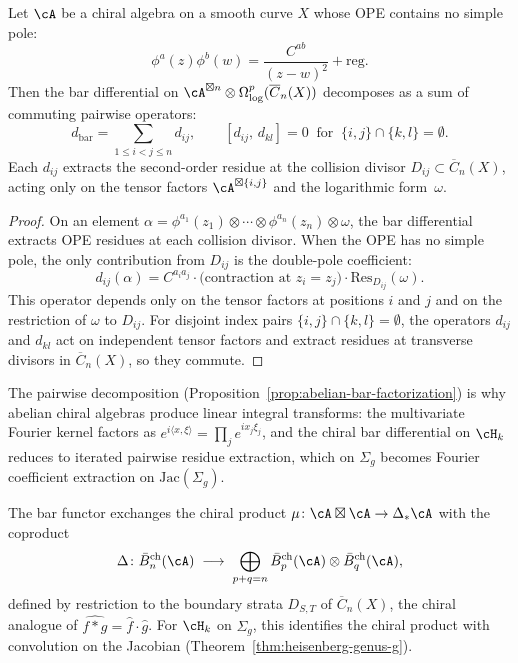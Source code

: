 \begin{proposition}
\label{prop:abelian-bar-factorization}
Let\/ $\cA$ be a chiral algebra on a smooth curve $X$ whose OPE
contains no simple pole:
\[
\phi^a(z)\phi^b(w)
= \frac{C^{ab}}{(z-w)^2} + \mathrm{reg}.
\]
Then the bar differential on
$\cA^{\boxtimes n} \otimes \Omega^p_{\log}(\overline{C}_n(X))$
decomposes as a sum of commuting pairwise operators:
\[
d_{\mathrm{bar}} = \sum_{1 \leq i < j \leq n} d_{ij},
\qquad
[d_{ij},\, d_{kl}] = 0
\;\;\text{for}\;\;
\{i,j\} \cap \{k,l\} = \emptyset.
\]
Each $d_{ij}$ extracts the second-order residue at the collision
divisor $D_{ij} \subset \overline{C}_n(X)$, acting only on the
tensor factors $\cA^{\boxtimes\{i,j\}}$ and the logarithmic
form~$\omega$.
\end{proposition}

\begin{proof}
On an element
$\alpha = \phi^{a_1}(z_1) \otimes \cdots \otimes \phi^{a_n}(z_n)
\otimes \omega$,
the bar differential extracts OPE residues at each collision
divisor. When the OPE has no simple pole, the only contribution
from $D_{ij}$ is the double-pole coefficient:
\[
d_{ij}(\alpha)
= C^{a_i a_j}
 \cdot \bigl(\text{contraction at } z_i = z_j\bigr)
 \cdot \mathrm{Res}_{D_{ij}}(\omega).
\]
This operator depends only on the tensor factors at positions $i$
and $j$ and on the restriction of $\omega$ to $D_{ij}$. For
disjoint index pairs $\{i,j\} \cap \{k,l\} = \emptyset$, the
operators $d_{ij}$ and $d_{kl}$ act on independent tensor factors
and extract residues at transverse divisors in
$\overline{C}_n(X)$, so they commute.
\end{proof}

\begin{remark}
\label{rem:pairwise-to-fourier}
The pairwise decomposition (Proposition~\ref{prop:abelian-bar-factorization}) is why abelian chiral algebras produce linear integral transforms: the multivariate Fourier kernel factors as $e^{i\langle x,\xi\rangle} = \prod_j e^{ix_j\xi_j}$, and the chiral bar differential on $\cH_k$ reduces to iterated pairwise residue extraction, which on $\Sigma_g$ becomes Fourier coefficient extraction on $\mathrm{Jac}(\Sigma_g)$.
\end{remark}

\begin{remark}
\label{rem:convolution-exchange}
The bar functor exchanges the chiral product $\mu\colon \cA \boxtimes \cA \to \Delta_* \cA$ with the coproduct
\[
\Delta\colon \bar{B}^{\mathrm{ch}}_n(\cA)
\;\longrightarrow\;
\bigoplus_{p+q=n} \bar{B}^{\mathrm{ch}}_p(\cA)
 \otimes \bar{B}^{\mathrm{ch}}_q(\cA),
\]
defined by restriction to the boundary strata $D_{S,T}$ of $\overline{C}_n(X)$, the chiral analogue of $\widehat{f * g} = \hat{f} \cdot \hat{g}$. For $\cH_k$ on $\Sigma_g$, this identifies the chiral product with convolution on the Jacobian (Theorem~\ref{thm:heisenberg-genus-g}).
\end{remark}

